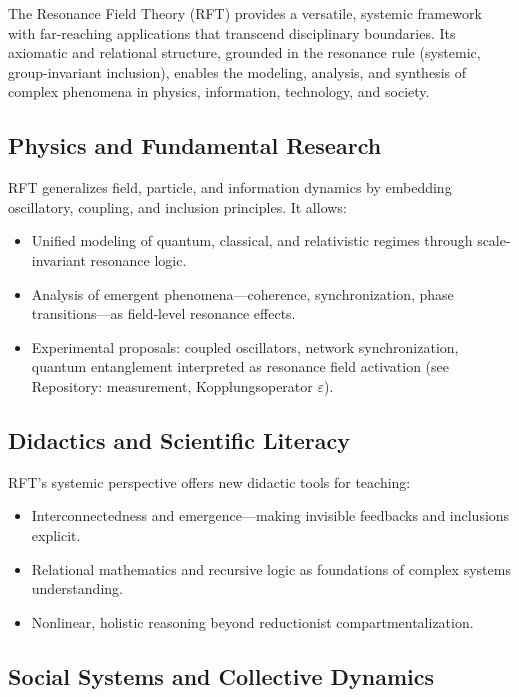 \documentclass[12pt]{article}
\begin{document}
	The Resonance Field Theory (RFT) provides a versatile, systemic framework with far-reaching applications that transcend disciplinary boundaries. Its axiomatic and relational structure, grounded in the resonance rule (systemic, group-invariant inclusion), enables the modeling, analysis, and synthesis of complex phenomena in physics, information, technology, and society.
	
	\subsection{Physics and Fundamental Research}
	
	RFT generalizes field, particle, and information dynamics by embedding oscillatory, coupling, and inclusion principles. It allows:
	\begin{itemize}
		\item Unified modeling of quantum, classical, and relativistic regimes through scale-invariant resonance logic.
		\item Analysis of emergent phenomena—coherence, synchronization, phase transitions—as field-level resonance effects.
		\item Experimental proposals: coupled oscillators, network synchronization, quantum entanglement interpreted as resonance field activation (see Repository: measurement, Kopplungsoperator $\varepsilon$).
	\end{itemize}
	
	\subsection{Didactics and Scientific Literacy}
	
	RFT’s systemic perspective offers new didactic tools for teaching:
	\begin{itemize}
		\item Interconnectedness and emergence—making invisible feedbacks and inclusions explicit.
		\item Relational mathematics and recursive logic as foundations of complex systems understanding.
		\item Nonlinear, holistic reasoning beyond reductionist compartmentalization.
	\end{itemize}
	
	\subsection{Social Systems and Collective Dynamics}
	
\end{document}
